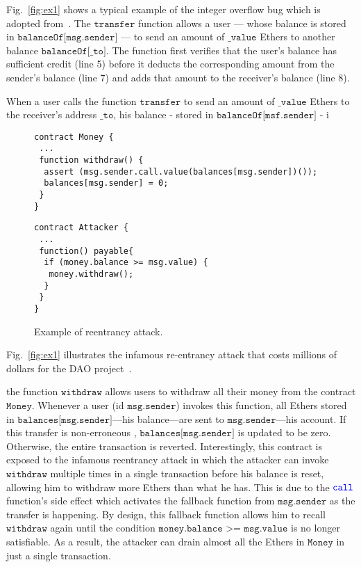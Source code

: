 \documentclass[runningheads]{llncs}
\newcommand{\code}[1]{\texttt{#1}}
\newcommand{\ct}[1]{{\color{red}#1}}
\begin{document}
Fig.~\ref{fig:ex1} shows a typical example of the integer overflow bug which is adopted from~\cite{ebugs}. The $\code{transfer}$ function allows a user --- whose balance is stored in $\code{balanceOf[msg.sender]}$ --- to send an amount of $\code{\_value}$ Ethers to another balance $\code{balanceOf[\_to]}$. The function first verifies that the user's balance has sufficient credit (line 5) before it deducts the corresponding amount from the sender's balance (line 7) and adds that amount to the receiver's balance (line 8).

When a user calls the function $\code{transfer}$ to send an amount of $\code{\_value}$ Ethers to the receiver's address $\code{\_to}$, his balance - stored in $\code{balanceOf[msf.sender]}$ - i



\begin{figure}
\begin{lstlisting}[language=Solidity]
contract Money {
 ...
 function withdraw() {
  assert (msg.sender.call.value(balances[msg.sender])());
  balances[msg.sender] = 0;
 }
}
\end{lstlisting}

\begin{lstlisting}[language=Solidity]
contract Attacker {
 ...
 function() payable{
  if (money.balance >= msg.value) {
   money.withdraw();
  }
 }
}
\end{lstlisting}
\caption{Example of reentrancy attack.}\label{fig:ex2}
\end{figure}


Fig.~\ref{fig:ex1} illustrates the infamous re-entrancy attack that costs millions of dollars for the DAO project~\ct.


 the function $\code{withdraw}$ allows users to withdraw all their money from the contract $\code{Money}$. Whenever a user (id $\code{msg.sender}$) invokes this function, all Ethers stored in $\code{balances[msg.sender]}$---his balance---are sent to $\code{msg.sender}$---his account. If this transfer is non-erroneous ,  $\code{balances[msg.sender]}$ is updated to be zero. Otherwise, the entire transaction is reverted. Interestingly, this contract is exposed to the infamous reentrancy attack in which the attacker can invoke $\texttt{withdraw}$ multiple times in a single transaction before his balance is reset, allowing him to withdraw more Ethers than what he has. This is due to the $\color{blue}\texttt{call}$ function's side effect which activates the fallback function from $\texttt{msg.sender}$ as the transfer is happening. By design, this fallback function allows him to recall $\texttt{withdraw}$ again until the condition $\texttt{money.balance >= msg.value}$ is no longer satisfiable. As a result, the attacker can drain almost all the Ethers in $\texttt{Money}$ in just a single transaction.
\end{document}
